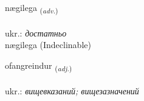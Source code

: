 \documentclass[frontgrid, backgrid]{flacards}\usepackage[]{graphicx}\usepackage[]{xcolor}
\begin{document}

\renewcommand{\flhead}{\vskip5pt \fboxsep=0pt {\small\bfseries\footnotesize Atviksorð | прислівник}}
\renewcommand{\fcfoot}{\vskip5pt \fboxsep=0pt \hspace{2pt}{\small\bfseries\footnotesize 2K}}

\renewcommand{\blhead}{\vskip5pt {\small\bfseries\footnotesize Atviksorð | прислівник }}
\renewcommand{\bcfoot}{\vskip5pt \hspace{2pt}{\small\bfseries\footnotesize 2K}}


{nægilega \small{\textsubscript{(\textit{adv.})}} \\[1ex]
\textphonetic{[naijɪlɛɣa]} \\
ukr.: \emph{достатньо} \\  [2ex]
nægilega (Indeclinable)}

\renewcommand{\flhead}{\vskip5pt \fboxsep=0pt {\small\bfseries\footnotesize Lýsingarorð | прикметник}}
\renewcommand{\fcfoot}{\vskip5pt \fboxsep=0pt \hspace{2pt}{\small\bfseries\footnotesize 2K}}

\renewcommand{\blhead}{\vskip5pt {\small\bfseries\footnotesize Lýsingarorð | прикметник }}
\renewcommand{\bcfoot}{\vskip5pt \hspace{2pt}{\small\bfseries\footnotesize 2K}}


{ofangreindur \small{\textsubscript{(\textit{adj.})}} \\[1ex] %
\textphonetic{[ɔːvankreintʏr]} \\
ukr.: \emph{вищевказаний; вищезазначений} \\  [2ex]
\renewcommand*{\arraystretch}{0.8}
}
\end{document}
